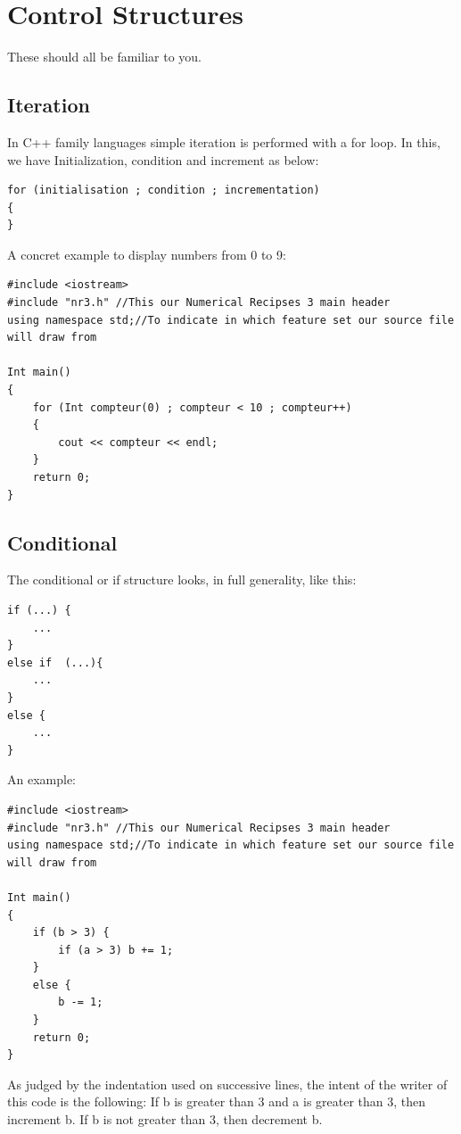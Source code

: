 \documentclass[12pt]{report}
\begin{document}
\newpage
\section{Control Structures}

These should all be familiar to you.

\subsection{Iteration}

In C++ family languages simple iteration is performed with a for loop. In this, we have Initialization, condition and increment as below:
\begin{lstlisting}[style=CStyle]
for (initialisation ; condition ; incrementation)
{
}
\end{lstlisting}

A concret example to display numbers from 0 to 9:

\begin{lstlisting}[style=CStyle]
#include <iostream>
#include "nr3.h" //This our Numerical Recipses 3 main header
using namespace std;//To indicate in which feature set our source file will draw from

Int main()
{
    for (Int compteur(0) ; compteur < 10 ; compteur++)
    {
        cout << compteur << endl;
    }
    return 0;
}
\end{lstlisting}

\subsection{Conditional}

The conditional or if structure looks, in full generality, like
this:
\begin{lstlisting}[style=CStyle]
if (...) {
    ...
}
else if  (...){
    ...
}
else {
    ...
}
\end{lstlisting}

An example: 
\begin{lstlisting}[style=CStyle]
#include <iostream>
#include "nr3.h" //This our Numerical Recipses 3 main header
using namespace std;//To indicate in which feature set our source file will draw from

Int main()
{
    if (b > 3) {
        if (a > 3) b += 1;
    } 
    else {
        b -= 1;
    }
    return 0;
}
\end{lstlisting}

As judged by the indentation used on successive lines, the intent of the writer of this
code is the following: If b is greater than 3 and a is greater than 3, then increment
b. If b is not greater than 3, then decrement b.
\end{document}
